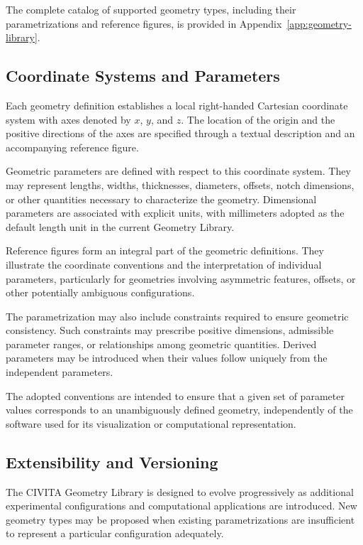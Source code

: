 The complete catalog of supported geometry types, including their parametrizations and reference figures, is provided in Appendix~\ref{app:geometry-library}.

\subsection{Coordinate Systems and Parameters}

Each geometry definition establishes a local right-handed Cartesian coordinate system with axes denoted by $x$, $y$, and $z$. The location of the origin and the positive directions of the axes are specified through a textual description and an accompanying reference figure.

Geometric parameters are defined with respect to this coordinate system. They may represent lengths, widths, thicknesses, diameters, offsets, notch dimensions, or other quantities necessary to characterize the geometry. Dimensional parameters are associated with explicit units, with millimeters adopted as the default length unit in the current Geometry Library.

Reference figures form an integral part of the geometric definitions. They illustrate the coordinate conventions and the interpretation of individual parameters, particularly for geometries involving asymmetric features, offsets, or other potentially ambiguous configurations.

The parametrization may also include constraints required to ensure geometric consistency. Such constraints may prescribe positive dimensions, admissible parameter ranges, or relationships among geometric quantities. Derived parameters may be introduced when their values follow uniquely from the independent parameters.

The adopted conventions are intended to ensure that a given set of parameter values corresponds to an unambiguously defined geometry, independently of the software used for its visualization or computational representation.

\subsection{Extensibility and Versioning}

The CIVITA Geometry Library is designed to evolve progressively as additional experimental configurations and computational applications are introduced. New geometry types may be proposed when existing parametrizations are insufficient to represent a particular configuration adequately.

